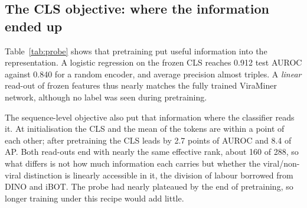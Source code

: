 \documentclass[10pt,twocolumn,a4paper]{article}
\begin{document}
\subsection{The CLS objective: where the information ended up}\label{sec:res:cls}

Table~\ref{tab:probe} shows that pretraining put useful information into the
representation. A logistic regression on the frozen CLS reaches 0.912 test AUROC
against 0.840 for a random encoder, and average precision almost triples. A
\emph{linear} read-out of frozen features thus nearly matches the fully trained
ViraMiner network, although no label was seen during pretraining.

The sequence-level objective also put that information where the classifier
reads it. At initialisation the CLS and the mean of the tokens are within a
point of each other; after pretraining the CLS leads by 2.7 points of AUROC and
8.4 of AP. Both read-outs end with nearly the same effective rank, about 160 of
288, so what differs is not how much information each carries but whether the
viral/non-viral distinction is linearly accessible in it, the division of labour
borrowed from DINO and iBOT. The probe had nearly plateaued by the end of
pretraining, so longer training under this recipe would add little.
\end{document}

